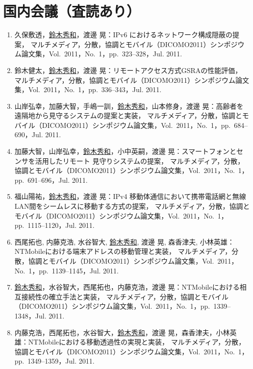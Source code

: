 \section*{国内会議（査読あり）}
\begin{enumerate}
\item 久保敷透，\underline{鈴木秀和}，渡邊 晃：IPv6 におけるネットワーク構成隠蔽の提案，
マルチメディア，分散，協調とモバイル（DICOMO2011）シンポジウム論文集，Vol.~2011，No.~1，pp.\ 323--328，Jul. 2011.

\item 鈴木健太，\underline{鈴木秀和}，渡邊 晃：リモートアクセス方式GSRAの性能評価，
マルチメディア，分散，協調とモバイル（DICOMO2011）シンポジウム論文集，Vol.~2011，No.~1，pp.\ 336--343，Jul. 2011.

\item 山岸弘幸，加藤大智，手嶋一訓，\underline{鈴木秀和}，山本修身，渡邊 晃：高齢者を遠隔地から見守るシステムの提案と実装，
マルチメディア，分散，協調とモバイル（DICOMO2011）シンポジウム論文集，Vol.~2011，No.~1，pp.\ 684--690，Jul. 2011.

\item 加藤大智，山岸弘幸，\underline{鈴木秀和}，小中英嗣，渡邊 晃：スマートフォンとセンサを活用したリモート 見守りシステムの提案，
マルチメディア，分散，協調とモバイル（DICOMO2011）シンポジウム論文集，Vol.~2011，No.~1，pp.\ 691--696，Jul. 2011.

\item 福山陽祐，\underline{鈴木秀和}，渡邊 晃：IPv4 移動体通信において携帯電話網と無線LAN間をシームレスに移動する方式の提案，
マルチメディア，分散，協調とモバイル（DICOMO2011）シンポジウム論文集，Vol.~2011，No.~1，pp.\ 1115--1120，Jul. 2011.

\item 西尾拓也, 内藤克浩, 水谷智大, \underline{鈴木秀和}, 渡邊 晃, 森香津夫, 小林英雄：NTMobileにおける端末アドレスの移動管理と実装，
マルチメディア，分散，協調とモバイル（DICOMO2011）シンポジウム論文集，Vol.~2011，No.~1，pp.\ 1139--1145，Jul. 2011.

\item \underline{鈴木秀和}，水谷智大，西尾拓也，内藤克浩，渡邊 晃：NTMobileにおける相互接続性の確立手法と実装，
マルチメディア，分散，協調とモバイル（DICOMO2011）シンポジウム論文集，Vol.~2011，No.~1，pp.\ 1339--1348，Jul. 2011.

\item 内藤克浩，西尾拓也，水谷智大，\underline{鈴木秀和}，渡邊 晃，森香津夫，小林英雄：NTMobileにおける移動透過性の実現と実装，
マルチメディア，分散，協調とモバイル（DICOMO2011）シンポジウム論文集，Vol.~2011，No.~1，pp.\ 1349--1359，Jul. 2011.
\end{enumerate}

